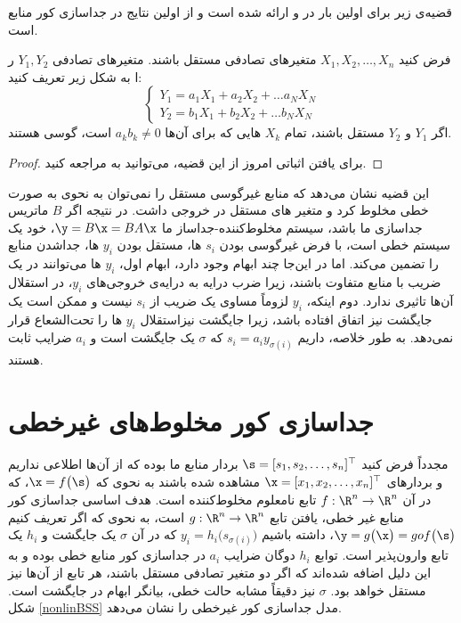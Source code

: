 \newpage
قضیه‌ی زیر برای اولین بار در
\cite{darmois}
و
\cite{skitovich}
ارائه شده است و از اولین نتایج در جداسازی کور منابع است. 
\begin{theorem}
\label{darmois_skitovic}
فرض کنید 
$X_1,X_2, \dots, X_n$
متغیرهای تصادفی مستقل باشند. متغیر‌های تصادفی 
$Y_1,Y_2$
ر ا به شکل زیر تعریف کنید:
\begin{equation}
\begin{cases}
Y_1 = a_1X_1 + a_2 X_2 + \dots a_NX_N\\
Y_2 = b_1X_1 + b_2 X_2 + \dots b_NX_N
\end{cases}
\end{equation}
اگر 
$Y_1$
و 
 $Y_2$
 مستقل باشند، تمام $X_k$ هایی که برای آن‌ها
 $a_kb_k \neq 0$
 است، گوسی هستند.
\end{theorem}
\begin{proof}
برای یافتن اثباتی امروز از این قضیه، می‌توانید به 
\cite{newdarmois}
مراجعه کنید.
\end{proof}
این قضیه نشان می‌دهد که منابع غیرگوسی مستقل را نمی‌توان به نحوی به صورت خطی مخلوط کرد و متغیر های مستقل در خروجی داشت. در نتیجه  اگر 
$B$
ماتریس جداسازی ما باشد،
سیستم مخلوط‌کننده-جداساز ما
$\y = B\x = BA\x$،
خود یک سیستم خطی است، با فرض غیرگوسی بودن 
$s_i$
ها، مستقل بودن 
$y_i$
ها، جداشدن منابع را تضمین می‌کند. اما در این‌جا چند ابهام وجود دارد، ابهام اول، $y_i$ ها می‌توانند در یک ضریب با منابع متفاوت باشند، زیرا ضرب درایه‌ به درایه‌ی خروجی‌های $y_i$، در استقلال آن‌ها تاثیری ندارد. دوم اینکه، $y_i$ لزوماً مساوی یک ضریب از 
$s_i$
نیست و ممکن است یک جایگشت نیز اتفاق افتاده باشد، زیرا جایگشت نیزاستقلال 
$y_i$
ها را تحت‌الشعاع قرار نمی‌دهد. به طور خلاصه، داریم
$s_i = a_i y_{\sigma(i)}$
که 
$\sigma$
یک جایگشت است و 
$a_i$
ضرایب ثابت هستند.

\section{جداسازی کور مخلوط‌های غیرخطی}

مجدداً فرض کنید $\s = [s_1, s_2, \dots, s_n]^\top$ بردار منابع ما بوده که از آن‌ها اطلاعی نداریم و بردار‌های 
$\x = [x_1, x_2, \dots, x_n]^\top$
مشاهده شده باشند به نحوی که 
$\x = f\big(\s\big)$،
که در آن 
$f : \R^n \to \R^n$
تابع نامعلوم مخلوط‌کننده است. هدف اساسی جداسازی کور منابع غیر خطی، یافتن تابع 
$g : \R^n \to \R^n$
است، به نحوی که اگر تعریف کنیم
$\y = g\big(\x\big) = gof \big(\s\big)$،
داشته باشیم
$y_i = h_i \big(s_{\sigma(i)}\big)$
که در آن 
$\sigma$
یک جایگشت و $h_i$ یک تابع وارون‌پذیر است. توابع‌
$h_i$
دوگان ضرایب 
$a_i$
در جداسازی کور منابع خطی بوده و به این دلیل اضافه شده‌اند که اگر دو متغیر تصادفی مستقل باشند، هر تابع از آن‌ها نیز مستقل خواهد بود. 
$\sigma$
نیز دقیقاً مشابه حالت خطی، بیانگر ابهام در جایگشت است. شکل 
\eqref{nonlinBSS}
مدل جداسازی کور غیرخطی را نشان می‌دهد.

